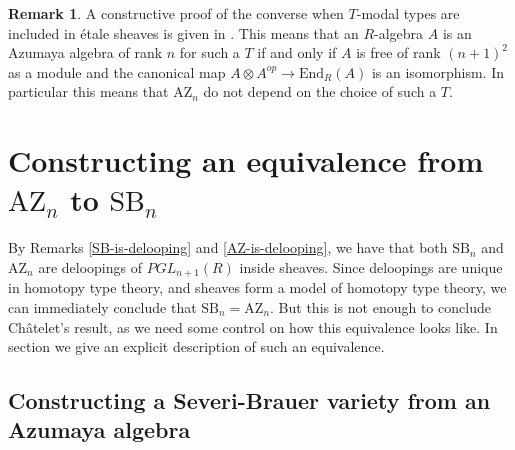 \documentclass[10pt,a4paper]{article}
\theoremstyle{definition}
\newtheorem{remark}[theorem]{Remark}
\newcommand{\SB}{\mathrm{SB}}
\newcommand{\AZ}{\mathrm{AZ}}
\newcommand{\propTrunc}[1]{\lVert #1 \rVert}
\begin{document}
\begin{remark}\label{azumaya-independent-modality}
A constructive proof of the converse when $T$-modal types are included in étale sheaves is given in \cite{coqazumaya}. This means that an $R$-algebra $A$ is an Azumaya algebra of rank $n$ for such a $T$ if and only if $A$ is free of rank $(n+1)^2$ as a module and the canonical map $A\otimes A^{op}\to \mathrm{End}_R(A)$ is an isomorphism. In particular this means that $\AZ_n$ do not depend on the choice of such a $T$.
\end{remark}




\section{Constructing an equivalence from $\AZ_n$ to $\SB_n$}

By Remarks \ref{SB-is-delooping} and \ref{AZ-is-delooping}, we have that both $\SB_n$ and $\AZ_n$ are deloopings of $PGL_{n+1}(R)$ inside sheaves. Since deloopings are unique in homotopy type theory, and sheaves form a model of homotopy type theory, we can immediately conclude that $\SB_n = \AZ_n$. But this is not enough to conclude Ch\^atelet's result, as we need some control on how this equivalence looks like. In section we give an explicit description of such an equivalence.


\subsection{Constructing a Severi-Brauer variety from an Azumaya algebra}
\end{document}

